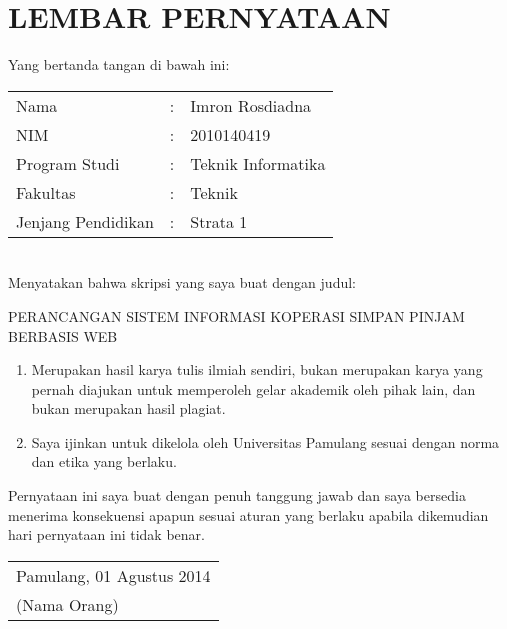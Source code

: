 %

\chapter*{\uppercase{LEMBAR PERNYATAAN}}
\vspace{1cm}

\noindent Yang bertanda tangan di bawah ini:
\renewcommand{\arraystretch}{1.5}
\begin{table}[ht]
\begin{adjustwidth}{-0.15cm}{}
	\begin{tabular}{lll}
		Nama & : & Imron Rosdiadna \\
		NIM & : & 2010140419 \\
		Program Studi & : & Teknik Informatika \\
		Fakultas & : & Teknik \\
		Jenjang Pendidikan & : & Strata 1
	\end{tabular}
\end{adjustwidth}
\end{table} \\

\vspace{-1cm}
\noindent Menyatakan bahwa skripsi yang saya buat dengan judul:

\vspace{0.3cm}
\noindent PERANCANGAN SISTEM INFORMASI KOPERASI SIMPAN PINJAM BERBASIS WEB
\begin{enumerate}[nolistsep,leftmargin=0.5cm]
	\item Merupakan hasil karya tulis ilmiah sendiri, bukan merupakan karya yang pernah diajukan untuk memperoleh gelar akademik oleh pihak lain, dan bukan merupakan hasil plagiat.
	\item Saya ijinkan untuk dikelola oleh Universitas Pamulang sesuai dengan norma dan etika yang berlaku.
\end{enumerate}
Pernyataan ini saya buat dengan penuh tanggung jawab dan saya bersedia menerima konsekuensi apapun sesuai aturan yang berlaku apabila dikemudian hari pernyataan ini tidak benar.

\vspace{2cm}
\begin{table}[ht]
\begin{adjustwidth}{-0.15cm}{}
	\begin{tabular}{l}
	Pamulang, 01 Agustus 2014 \\[2cm]
	(Nama Orang)
	\end{tabular}
\end{adjustwidth}	
\end{table}

\newpage
